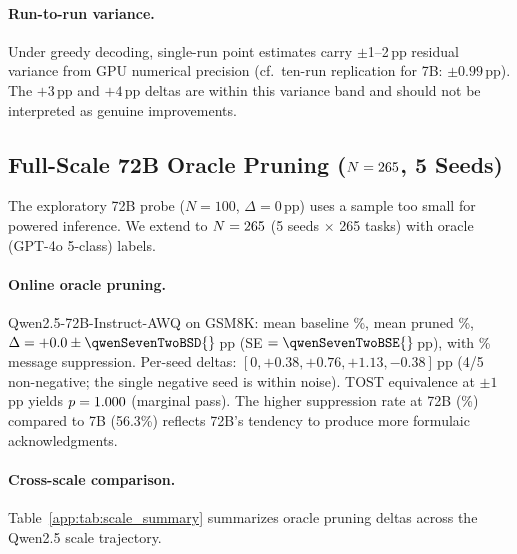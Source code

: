 \paragraph{Run-to-run variance.} Under greedy decoding, single-run point estimates carry $\pm$1--2\,pp residual variance from GPU numerical precision (cf.\ ten-run replication for 7B: $\pm 0.99$\,pp). The $+3$\,pp and $+4$\,pp deltas are within this variance band and should not be interpreted as genuine improvements.

\subsection{Full-Scale 72B Oracle Pruning ($N = 265{}$, 5 Seeds)}
\label{app:scaling_72b}

The exploratory 72B probe ($N = 100$, $\Delta = 0$\,pp) uses a sample too small for powered inference. We extend to $N = 265{}$ (5 seeds $\times$ 265 tasks) with oracle (GPT-4o 5-class) labels.

\paragraph{Online oracle pruning.} Qwen2.5-72B-Instruct-AWQ on GSM8K: mean baseline \qwenSevenTwoBBaseline{}\%, mean pruned \qwenSevenTwoBPruned{}\%, $\Delta = \qwenSevenTwoBDelta{} \pm \qwenSevenTwoBSD{}$\,pp (SE $= \qwenSevenTwoBSE{}$\,pp), with \qwenSevenTwoBSupp{}\% message suppression. Per-seed deltas: $[0, +0.38, +0.76, +1.13, -0.38]$\,pp (4/5 non-negative; the single negative seed is within noise). TOST equivalence at $\pm 1$\,pp yields $p = 1.000{}$ (marginal pass). The higher suppression rate at 72B (\qwenSevenTwoBSupp{}\%) compared to 7B (56.3\%) reflects 72B's tendency to produce more formulaic acknowledgments.

\paragraph{Cross-scale comparison.} Table~\ref{app:tab:scale_summary} summarizes oracle pruning deltas across the Qwen2.5 scale trajectory.

